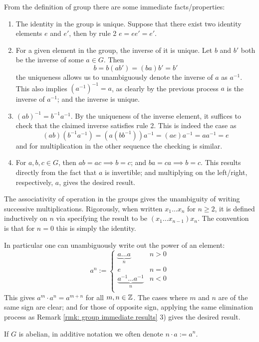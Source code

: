 \documentclass{article}
\begin{document}
\begin{remark}\label{rmk: group immediate results}
    From the definition of group there are some immediate facts/properties:
    \begin{enumerate}[label=\arabic*)]
        \item The identity in the group is unique. Suppose that there exist two identity elements $e$ and $e'$, then by rule 2 $e = ee' = e'$.
        \item For a given element in the group, the inverse of it is unique. Let $b$ and $b'$ both be the inverse of some $a \in G$. Then
        \[
            b = b(ab') = (ba)b' = b'    
        \]
        the uniqueness allows us to unambiguously denote the inverse of $a$ as $a^{-1}$. This also implies $(a^{-1})^{-1} = a$, as clearly by the previous process $a$ is the inverse of $a^{-1}$; and the inverse is unique.
        \item $(ab)^{-1} = b^{-1} a^{-1}$. By the uniqueness of the inverse element, it suffices to check that the claimed inverse satisfies rule 2. This is indeed the case as
        \[
            (ab)(b^{-1}a^{-1}) = (a(bb^{-1}))a^{-1} = (ae)a^{-1} = aa^{-1} = e
        \]
        and for multiplication in the other sequence the checking is similar. 
        \item For $a, b, c \in G$, then $ab = ac \implies b = c$; and $ba = ca \implies b = c$. This results directly from the fact that $a$ is invertible; and multiplying on the left/right, respectively, $a$, gives the desired result.
    \end{enumerate}
\end{remark}

\begin{remark}\label{rmk: Z to group element}
    The associativity of operation in the groups gives the unambiguity of writing successive multiplications. Rigorously, when written $x_1\ldots x_n$ for $n \geq 2$, it is defined inductively on $n$ via specifying the result to be $(x_1\ldots x_{n-1})x_n$. The convention is that for $n = 0$ this is simply the identity.

    In particular one can unambiguously write out the power of an element:
    \[
        a^n := \begin{cases}
            \underbrace{a\ldots a}_{n}  & n > 0 \\
            e                           & n = 0 \\
            \underbrace{a^{-1}\ldots a^{-1}}_{n} & n < 0 \\
        \end{cases}
    \]
    This gives $a^m \cdot a^n = a^{m + n}$ for all $m, n \in \mathbb{Z}$. The cases where $m$ and $n$ are of the same sign are clear; and for those of opposite sign, applying the same elimination process as Remark \ref{rmk: group immediate results} 3) gives the desired result.

    If $G$ is abelian, in additive notation we often denote $n \cdot a := a^n$.
\end{remark}
\end{document}
